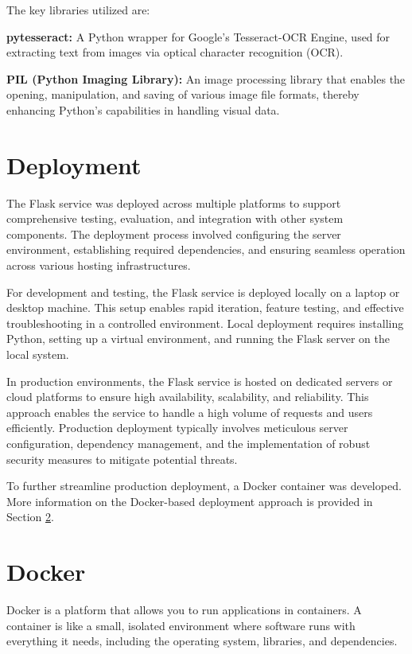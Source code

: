 The key libraries utilized are:

\textbf{pytesseract:} A Python wrapper for Google's Tesseract-OCR Engine, used for extracting text from images via optical character recognition (OCR).

\textbf{PIL (Python Imaging Library):} An image processing library that enables the opening, manipulation, and saving of various image file formats, thereby enhancing Python's capabilities in handling visual data.

\section{Deployment}

The Flask service was deployed across multiple platforms to support comprehensive testing, evaluation, and integration with other system components. The deployment process involved configuring the server environment, establishing required dependencies, and ensuring seamless operation across various hosting infrastructures.

For development and testing, the Flask service is deployed locally on a laptop or desktop machine. This setup enables rapid iteration, feature testing, and effective troubleshooting in a controlled environment. Local deployment requires installing Python, setting up a virtual environment, and running the Flask server on the local system.

In production environments, the Flask service is hosted on dedicated servers or cloud platforms to ensure high availability, scalability, and reliability. This approach enables the service to handle a high volume of requests and users efficiently. Production deployment typically involves meticulous server configuration, dependency management, and the implementation of robust security measures to mitigate potential threats.

To further streamline production deployment, a Docker container was developed. More information on the Docker-based deployment approach is provided in Section \ref{sec:docker}.

\section{Docker}
\label{sec:docker}
Docker is a platform that allows you to run applications in containers. A container is like a small, isolated environment where software runs with everything it needs, including the operating system, libraries, and dependencies.

